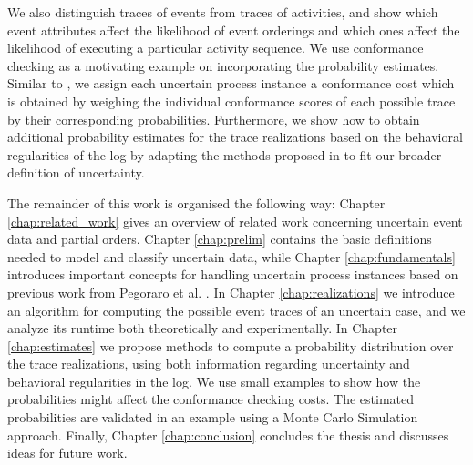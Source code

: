 We also distinguish traces of events from traces of activities, and show which event attributes affect the likelihood of event orderings and which ones affect the likelihood of executing a particular activity sequence.
We use conformance checking as a motivating example on incorporating the probability estimates.
Similar to \cite{por}, we assign each uncertain process instance a conformance cost which is obtained by weighing the individual conformance scores of each possible trace by their corresponding probabilities.
Furthermore, we show how to obtain additional probability estimates for the trace realizations based on the behavioral regularities of the log by adapting the methods proposed in \cite{por} to fit our broader definition of uncertainty.

The remainder of this work is organised the following way: Chapter \ref{chap:related_work} gives an overview of related work concerning uncertain event data and partial orders.
Chapter \ref{chap:prelim} contains the basic definitions needed to model and classify uncertain data, while Chapter \ref{chap:fundamentals} introduces important concepts for handling uncertain process instances based on previous work from Pegoraro et al. \citep{mining,discovery,efficient,conformance}.
In Chapter \ref{chap:realizations} we introduce an algorithm for computing the possible event traces of an uncertain case, and we analyze its runtime both theoretically and experimentally.
In Chapter \ref{chap:estimates} we propose methods to compute a probability distribution over the trace realizations, using both information regarding uncertainty and behavioral regularities in the log.
We use small examples to show how the probabilities might affect the conformance checking costs.
The estimated probabilities are validated in an example using a Monte Carlo Simulation approach.  
Finally, Chapter \ref{chap:conclusion} concludes the thesis and discusses ideas for future work.




%
%
%
%
%
%
%
